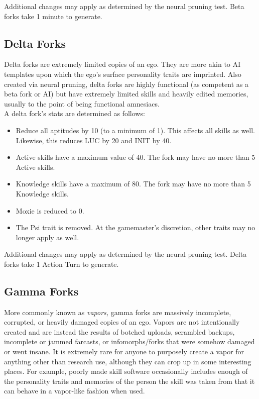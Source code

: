 Additional changes may apply as determined by the neural pruning test. Beta forks take 1 minute to generate. 

\subsection{Delta Forks} 

Delta forks are extremely limited copies of an ego. They are more akin to AI templates upon which the ego's surface personality traits are imprinted. Also created via neural pruning, delta forks are highly functional (as competent as a beta fork or AI) but have extremely limited skills and heavily edited memories, usually to the point of being functional amnesiacs. \\ A delta fork's stats are determined as follows: 

\begin{itemize} \item Reduce all aptitudes by 10 (to a minimum of 1). This affects all skills as well. Likewise, this reduces LUC by 20 and INIT by 40. \item Active skills have a maximum value of 40. The fork may have no more than 5 Active skills. 

\item Knowledge skills have a maximum of 80. The fork may have no more than 5 Knowledge skills. \item Moxie is reduced to 0. \item The Psi trait is removed. At the gamemaster's discretion, other traits may no longer apply as well. \end{itemize} 

Additional changes may apply as determined by the neural pruning test. Delta forks take 1 Action Turn to generate. 

\subsection{Gamma Forks} 

More commonly known as \textit{vapors,} gamma forks are massively incomplete, corrupted, or heavily damaged copies of an ego. Vapors are not intentionally created and are instead the results of botched uploads, scrambled backups, incomplete or jammed farcasts, or infomorphs/forks that were somehow damaged or went insane. It is extremely rare for anyone to purposely create a vapor for anything other than research use, although they can crop up in some interesting places. For example, poorly made skill software occasionally includes enough of the personality traits and memories of the person the skill was taken from that it can behave in a vapor-like fashion when used. 

